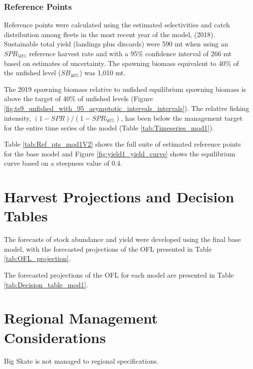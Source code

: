 \documentclass[12pt,]{article}
\begin{document}
\hypertarget{reference-points-1}{%
\subsubsection{Reference Points}\label{reference-points-1}}

Reference points were calculated using the estimated selectivities and
catch distribution among fleets in the most recent year of the model,
(2018). Sustainable total yield (landings plus discards) were 590 mt
when using an \(SPR_{50\%}\) reference harvest rate and with a 95\%
confidence interval of 266 mt based on estimates of uncertainty. The
spawning biomass equivalent to 40\% of the unfished level
(\(SB_{40\%}\)) was 1,010 mt.

The 2019 spawning biomass relative to unfished equilibrium spawning
biomass is above the target of 40\% of unfished levels (Figure
\ref{fig:ts9_unfished_with_95_asymptotic_intervals_intervals}). The
relative fishing intensity, \((1-SPR)/(1-SPR_{50\%})\), has been below
the management target for the entire time series of the model (Table
\ref{tab:Timeseries_mod1}).

Table \ref{tab:Ref_pts_mod1V2} shows the full suite of estimated
reference points for the base model and Figure
\ref{fig:yield1_yield_curve} shows the equilibrium curve based on a
steepness value of 0.4.

\newpage

\hypertarget{harvest-projections-and-decision-tables}{%
\section{Harvest Projections and Decision
Tables}\label{harvest-projections-and-decision-tables}}

The forecasts of stock abundance and yield were developed using the
final base model, with the forecasted projections of the OFL presented
in Table \ref{tab:OFL_projection}.

The forecasted projections of the OFL for each model are presented in
Table \ref{tab:Decision_table_mod1}.

\newpage

\hypertarget{regional-management-considerations}{%
\section{Regional Management
Considerations}\label{regional-management-considerations}}

Big Skate is not managed to regional specifications. \newpage
\end{document}
